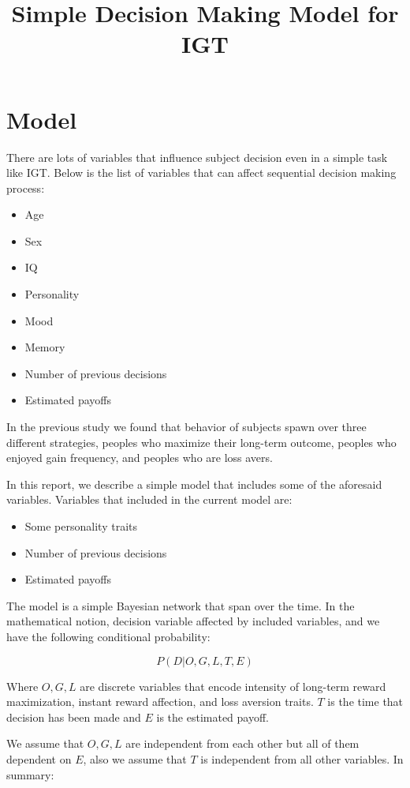 \documentclass[12pt]{article}
\title{Simple Decision Making Model for IGT}
\author{}
\date{}
\begin{document}
\maketitle
\section*{Model}

There are lots of variables that influence subject decision even in a simple
task like IGT.  Below is the list of variables that can affect sequential
decision making process:

\begin{itemize}
	\item Age
	\item Sex
	\item IQ
	\item Personality
	\item Mood
	\item Memory
	\item Number of previous decisions
	\item Estimated payoffs
\end{itemize}

In the previous study we found that behavior of subjects spawn over three
different strategies, peoples who maximize their long-term outcome, peoples who
enjoyed gain frequency, and peoples who are loss avers.

In this report, we describe a simple model that includes some of the aforesaid
variables. Variables that included in the current model are:

\begin{itemize}
	\item Some personality traits
	\item Number of previous decisions
	\item Estimated payoffs
\end{itemize}

The model is a simple Bayesian network that span over the time. In the
mathematical notion, decision variable affected by included variables, and we
have the following conditional probability:

\[
	P(D | O, G, L, T, E)
\]

Where $ O, G, L $ are discrete variables that encode intensity of long-term
reward maximization, instant reward affection, and loss aversion traits. $ T $
is the time that decision has been made and $ E $ is the estimated payoff.

We assume that $ O, G, L $ are independent from each other but all of them
dependent on $E$, also we assume that $ T $ is independent from all other
variables. In summary:
\end{document}
